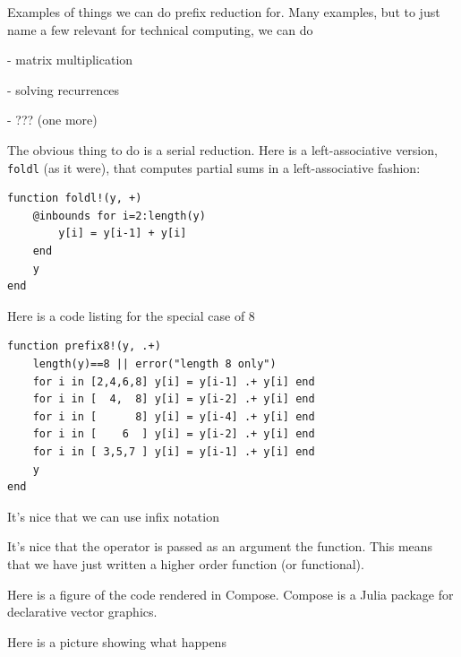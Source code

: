 \documentclass{sig-alternate}
\newcommand{\code}[1]{\texttt{#1}}
\begin{document}
Examples of things we can do prefix reduction for. Many examples, but to just name a few relevant for technical computing, we can do 

- matrix multiplication

- solving recurrences

- ??? (one more)

The obvious thing to do is a serial reduction. Here is a left-associative version, \code{foldl} (as it were), that computes partial sums in a left-associative fashion:

\begin{verbatim}
function foldl!(y, +)
    @inbounds for i=2:length(y)
        y[i] = y[i-1] + y[i]
    end
    y
end
\end{verbatim}

Here is a code listing for the special case of 8

\begin{verbatim}
function prefix8!(y, .+)
    length(y)==8 || error("length 8 only")
    for i in [2,4,6,8] y[i] = y[i-1] .+ y[i] end
    for i in [  4,  8] y[i] = y[i-2] .+ y[i] end
    for i in [      8] y[i] = y[i-4] .+ y[i] end
    for i in [    6  ] y[i] = y[i-2] .+ y[i] end
    for i in [ 3,5,7 ] y[i] = y[i-1] .+ y[i] end
    y
end
\end{verbatim}

It's nice that we can use infix notation

It's nice that the operator is passed as an argument the function. This means that we have just written a higher order function (or functional).

Here is a figure of the code rendered in Compose. Compose is a Julia package for declarative vector graphics. 

Here is a picture showing what happens
\end{document}
